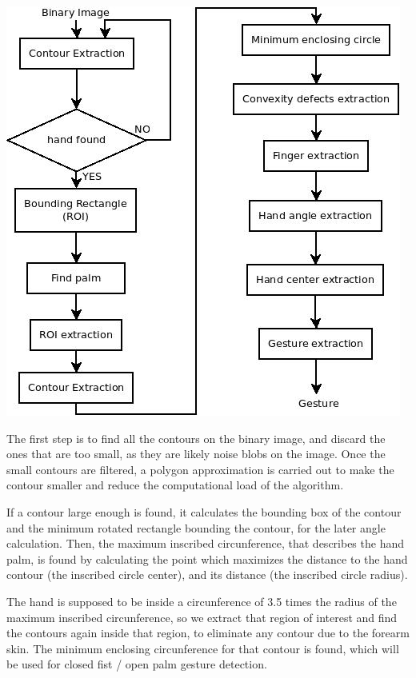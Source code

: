 \begin{center}
\includegraphics[scale=0.5]{../hand_description.jpeg} 
\end{center}

The first step is to find all the contours on the binary image, and discard the ones that are too small, as they are likely noise blobs on the image. Once the small contours are filtered, a polygon approximation is carried out to make the contour smaller and reduce the computational load of the algorithm.

If a contour large enough is found, it calculates the bounding box of the contour and the minimum rotated rectangle bounding the contour, for the later angle calculation. Then, the maximum inscribed circunference, that describes the hand palm, is found by calculating the point which maximizes the distance to the hand contour (the inscribed circle center), and its distance (the inscribed circle radius).

The hand is supposed to be inside a circunference of 3.5 times the radius of the maximum inscribed circunference, so we extract that region of interest and find the contours again inside that region, to eliminate any contour due to the forearm skin. The minimum enclosing circunference for that contour is found, which will be used for closed fist / open palm gesture detection.

